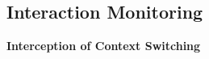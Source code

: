 \documentclass[conference]{IEEEtran}
\begin{document}
\subsection{Interaction Monitoring}
%


\textbf{Interception of Context Switching}
\end{document}
